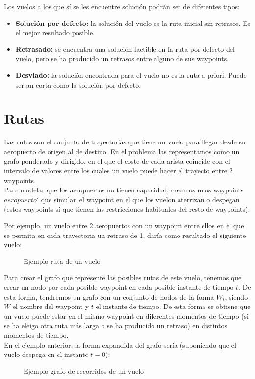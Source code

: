 Los vuelos a los que sí se les encuentre solución podrán ser  de diferentes tipos:
\begin{itemize}
	\item \textbf{Solución por defecto:} la solución del vuelo es la ruta inicial sin retrasos. Es el mejor resultado posible.
	\item \textbf{Retrasado:} se encuentra una solución factible en la ruta por defecto del vuelo, pero se ha producido un retrasos entre alguno de sus waypoints.
	\item \textbf{Desviado:} la solución encontrada para el vuelo no es la ruta a priori. Puede ser an corta como la solución por defecto.
\end{itemize}


\section{Rutas}
Las rutas son el conjunto de trayectorias que tiene un vuelo para llegar desde su aeropuerto de origen al de destino. En el problema las representamos como un grafo ponderado y dirigido, en el que el coste de cada arista coincide con el intervalo de valores entre los cuales un vuelo puede hacer el trayecto entre 2 waypoints.\\
Para modelar que los aeropuertos no tienen capacidad, creamos unos waypoints $aeropuerto'$ que simulan el waypoint en el que los vuelon aterrizan o despegan (estos waypoints sí que tienen las restricciones habituales del resto de waypoints).

Por ejemplo, un vuelo entre 2 aeropuertos con un waypoint entre ellos en el que se permita en cada trayectoria un retraso de 1, daría como resultado el siguiente vuelo:
\begin{figure}[H]
	\centering
	
	\caption{Ejemplo ruta de un vuelo}
	\label{fig: Ejemplo ruta de un vuelo}
\end{figure}

Para crear el grafo que represente las posibles rutas de este vuelo, tenemos que crear un nodo por cada posible waypoint en cada posible instante de tiempo $t$. De esta forma, tendremos un grafo con un conjunto de nodos de la forma $W_{t}$, siendo $W$ el nombre del waypoint y $t$ el instante de tiempo. De esta forma se obtiene que un vuelo puede estar en el mismo waypoint en diferentes momentos de tiempo (si se ha eleigo otra ruta más larga o se ha producido un retraso) en distintos momentos de tiempo.\\
En el ejemplo anterior, la forma expandida del grafo sería (suponiendo que el vuelo despega en el instante $t=0$): 
\begin{figure}[H]
	\centering
	
	\caption{Ejemplo grafo de recorridos de un vuelo}
	\label{fig: Ejemplo grafo de recorridos de un vuelo}
\end{figure}

